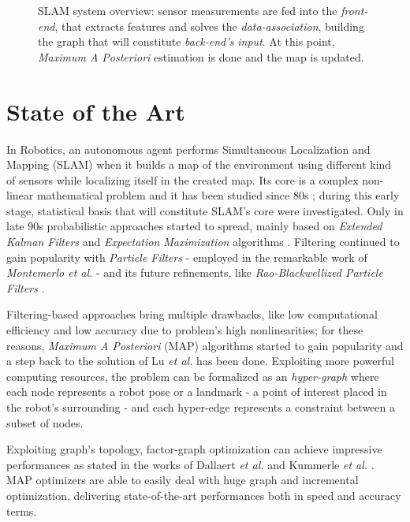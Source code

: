 \documentclass[10pt,a4paper, notitlepage]{report}
\begin{document}
\begin{figure}
    \centering
    \resizebox{0.8\textwidth}{!}{}
    \caption{SLAM system overview: sensor measurements are fed into the \textit{front-end}, that extracts features and solves the \textit{data-association}, building the graph that will constitute \textit{back-end's input}. At this point, \textit{Maximum A Posteriori} estimation is done and the map is updated.}
    \label{fig:slam-overview}
\end{figure}


\section*{State of the Art}
In Robotics, an autonomous agent performs Simultaneous Localization and Mapping (SLAM) when it builds a map of the environment using different kind of sensors while localizing itself in the created map. Its core is a complex non-linear mathematical problem and it has been studied since 80s \cite{durrant2006simultaneous} \cite{bailey2006simultaneous}; during this early stage, statistical basis that will constitute SLAM's core were investigated. Only in late 90s probabilistic approaches started to spread, mainly based on \textit{Extended Kalman Filters} \cite{leonard1990dynamic} \cite{dissanayake2001solution} and \textit{Expectation Maximization} algorithms \cite{dellaert2003mcmc} \cite{thrun2001probabilistic}. Filtering continued to gain popularity with \textit{Particle Filters} - employed in the remarkable work of \textit{Montemerlo et al.} \cite{montemerlo2002fastslam} - and its future refinements, like \textit{Rao-Blackwellized Particle Filters} \cite{grisetti2005improving} \cite{carlone2010rao} \cite{tipaldi2007heterogeneous}.

Filtering-based approaches bring multiple drawbacks, like low computational efficiency and low accuracy due to problem's high nonlinearities; for these reasons, \textit{Maximum A Posteriori} (MAP) algorithms started to gain popularity and a step back to the solution of Lu \textit{et al.} \cite{lu1997globally} has been done. Exploiting more powerful computing resources, the problem can be formalized as an \textit{hyper-graph} where each node represents a robot pose or a landmark - a point of interest placed in the robot's surrounding - and each hyper-edge represents a constraint between a subset of nodes. 

Exploiting graph's topology, factor-graph optimization can achieve impressive performances as stated in the works of Dallaert \textit{et al.} \cite{dellaert2006square} and Kummerle \textit{et al.}  \cite{kummerle2011g}. MAP optimizers \cite{kummerle2011g} \cite{dellaert2012gtsam} \cite{ceres-solver} \cite{kaess2012isam2} are able to easily deal with huge graph and incremental optimization, delivering state-of-the-art performances both in speed and accuracy terms.
\end{document}
